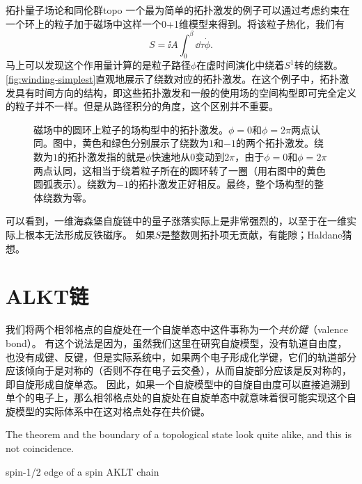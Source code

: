 \begin{back}{拓扑量子场论和同伦群}{topo}
    一个最为简单的拓扑激发的例子可以通过考虑约束在一个环上的粒子加于磁场中这样一个0+1维模型来得到。将该粒子热化，我们有
    \begin{equation}
        S = \ii A \int_0^\beta \dd{\tau} \dot{\phi}.
    \end{equation}
    马上可以发现这个作用量计算的是粒子路径$\phi$在虚时间演化中绕着$S^1$转的绕数。\autoref{fig:winding-simplest}直观地展示了绕数对应的拓扑激发。在这个例子中，拓扑激发具有时间方向的结构，即这些拓扑激发和一般的使用场的空间构型即可完全定义的粒子并不一样。但是从路径积分的角度，这个区别并不重要。
\end{back}

\begin{figure}
    \centering
    
    \caption{磁场中的圆环上粒子的场构型中的拓扑激发。$\phi=0$和$\phi=2\pi$两点认同。图中，黄色和绿色分别展示了绕数为$1$和$-1$的两个拓扑激发。绕数为$1$的拓扑激发指的就是$\phi$快速地从$0$变动到$2\pi$，由于$\phi=0$和$\phi=2\pi$两点认同，这相当于绕着粒子所在的圆环转了一圈（用右图中的黄色圆弧表示）。绕数为$-1$的拓扑激发正好相反。最终，整个场构型的整体绕数为零。}
    \label{fig:winding-simplest}
\end{figure}

可以看到，一维海森堡自旋链中的量子涨落实际上是非常强烈的，以至于在一维实际上根本无法形成反铁磁序。
如果$S$是整数则拓扑项无贡献，有能隙；Haldane猜想。 %

\section{ALKT链}

我们将两个相邻格点的自旋处在一个自旋单态中这件事称为一个\emph{共价键}（valence bond）。
有这个说法是因为，虽然我们这里在研究自旋模型，没有轨道自由度，也没有成键、反键，但是实际系统中，如果两个电子形成化学键，它们的轨道部分应该倾向于是对称的（否则不存在电子云交叠），从而自旋部分应该是反对称的，即自旋形成自旋单态。
因此，如果一个自旋模型中的自旋自由度可以直接追溯到单个的电子上，那么相邻格点处的自旋处在自旋单态中就意味着很可能实现这个自旋模型的实际体系中在这对格点处存在共价键。

The theorem and the boundary of a topological state look quite alike, and this is not coincidence.

spin-1/2 edge of a spin AKLT chain